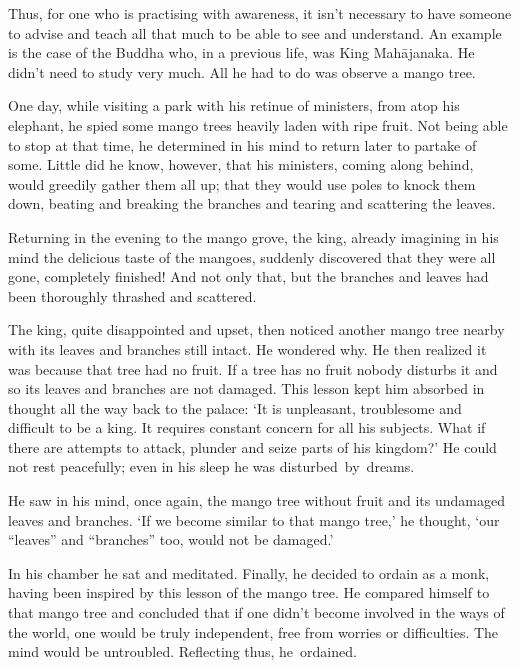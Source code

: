 Thus, for one who is practising with awareness, it isn't necessary to have someone to advise and teach all that much to be able to see and understand. An example is the case of the Buddha who, in a previous life, was King Mah\=ajanaka. He didn't need to study very much. All he had to do was observe a mango tree. 

One day, while visiting a park with his retinue of ministers, from atop his elephant, he spied some mango trees heavily laden with ripe fruit. Not being able to stop at that time, he determined in his mind to return later to partake of some. Little did he know, however, that his ministers, coming along behind, would greedily gather them all up; that they would use poles to knock them down, beating and breaking the branches and tearing and scattering the leaves. 

Returning in the evening to the mango grove, the king, already imagining in his mind the delicious taste of the mangoes, suddenly discovered that they were all gone, completely finished! And not only that, but the branches and leaves had been thoroughly thrashed and scattered. 

The king, quite disappointed and upset, then noticed another mango tree nearby with its leaves and branches still intact. He wondered why. He then realized it was because that tree had no fruit. If a tree has no fruit nobody disturbs it and so its leaves and branches are not damaged. This lesson kept him absorbed in thought all the way back to the palace: `It is unpleasant, troublesome and difficult to be a king. It requires constant concern for all his subjects. What if there are attempts to attack, plunder and seize parts of his kingdom?' He could not rest peacefully; even in his sleep he was disturbed~by~dreams. 

He saw in his mind, once again, the mango tree without fruit and its undamaged leaves and branches. `If we become similar to that mango tree,' he thought, `our ``leaves'' and ``branches'' too, would not be damaged.' 

In his chamber he sat and meditated. Finally, he decided to ordain as a monk, having been inspired by this lesson of the mango tree. He compared himself to that mango tree and concluded that if one didn't become involved in the ways of the world, one would be truly independent, free from worries or difficulties. The mind would be untroubled. Reflecting thus, he~ordained. 

